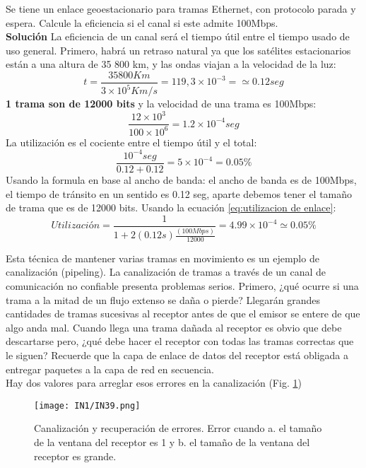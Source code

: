 \documentclass[
	12pt, %
	fleqn, %
	a4paper, %
]{LegrandOrangeBook}
\begin{document}
\begin{example}
Se tiene un enlace geoestacionario para tramas Ethernet, con protocolo parada y espera. Calcule la eficiencia si el canal si este admite 100Mbps.\\
\textbf{Solución}
La eficiencia de un canal será el tiempo útil entre el  tiempo usado de uso general.
Primero, habrá un retraso natural ya que los satélites estacionarios están a una altura de 35 800 km, y las ondas viajan a la velocidad de la luz:
\begin{displaymath}
t=\frac{35800 Km}{3\times 10^5 Km/s}=119,3\times 10^{-3}=\simeq 0.12 seg
\end{displaymath}
\textbf{1 trama son de 12000 bits} y la velocidad de una trama es 100Mbps:
\begin{displaymath}
\frac{12\times 10^3}{100\times 10^6}=1.2\times 10^{-4}seg
\end{displaymath}
La utilización es el cociente entre el tiempo útil y el total:
\begin{displaymath}
\frac{10^{-4}seg}{0.12+0.12}=5\times 10^{-4}=0.05\%
\end{displaymath}
Usando la formula en base al ancho de banda: el ancho de banda es de 100Mbps, el tiempo de tránsito en un sentido es 0.12 seg, aparte debemos tener el tamaño de trama que es de 12000 bits. Usando la ecuación \ref{eq:utilizacion de enlace}:
\begin{displaymath}
Utilización=\frac{1}{1+2(0.12s)\frac{(100Mbps)}{12000}}=4.99\times 10^{-4}\simeq 0.05\%
\end{displaymath}
\end{example}
Esta técnica de mantener varias tramas en movimiento es un ejemplo de canalización (pipeling). La canalización de tramas a través de un canal de comunicación no confiable presenta problemas serios. Primero, ¿qué ocurre si una trama a la mitad de un flujo extenso se daña o pierde? Llegarán grandes cantidades de tramas sucesivas al receptor antes de que el emisor se entere de que algo anda mal. Cuando llega una trama dañada al receptor es obvio que debe descartarse pero, ¿qué debe hacer el receptor con todas las tramas correctas que le siguen? Recuerde que la capa de enlace de datos del receptor está obligada a entregar paquetes a la capa de red en secuencia.\\
Hay dos valores para arreglar esos errores en la canalización (Fig. \ref{fig: canalización})
\begin{figure}[]
\centering
\texttt{[image: IN1/IN39.png]}
\caption{Canalización y recuperación de errores. Error cuando a. el tamaño de la ventana del receptor es 1 y b. el tamaño de la ventana del receptor es grande.}
\label{fig: canalización}
\end{figure}
\end{document}
